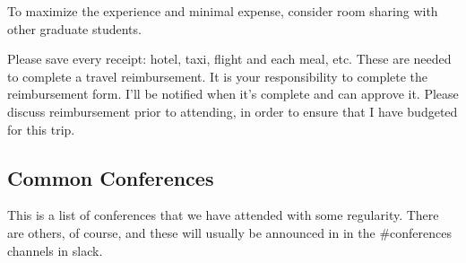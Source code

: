 \documentclass{article}
\begin{document}
To maximize the experience and minimal expense, consider room sharing with other graduate students.

Please save every receipt: hotel, taxi, flight and each meal, etc. These are needed to complete a travel reimbursement. It is your responsibility to complete the reimbursement form. I'll be notified when it's complete and can approve it. Please discuss reimbursement prior to attending, in order to ensure that I have budgeted for this trip. 


\subsection{Common Conferences}
This is a list of conferences that we have attended with some regularity.  There are others, of course, and these will usually be announced in in the \#conferences channels in slack.
\end{document}
